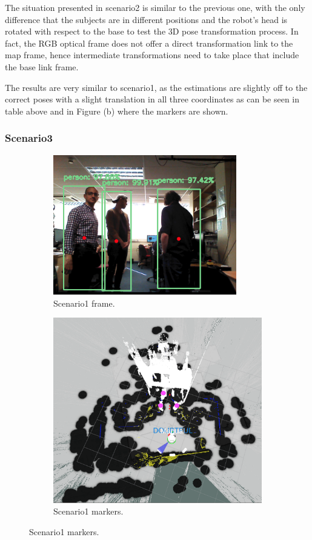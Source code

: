 The situation presented in scenario2 is similar to the previous one, with the only difference that the subjects are in different positions and the robot's head is rotated with respect to the base to test the 3D pose transformation process. In fact, the RGB optical frame does not offer a direct transformation link to the map frame, hence intermediate transformations need to take place that include the base link frame.

The results are very similar to scenario1, as the estimations are slightly off to the correct poses with a slight translation in all three coordinates as can be seen in table above and in Figure (b) where the markers are shown.

\subsubsection{Scenario3}

\begin{figure}[H]
    \begin{subfigure}{.5\textwidth}
        \centering
        \includegraphics[width=8cm]{images/chapter6_scenario3.png}
        \caption{Scenario1 frame.}
        \label{2a}
	\end{subfigure}
    \begin{subfigure}{.5\textwidth}
        \centering
        \includegraphics[width=.9\linewidth]{images/chapter6_extend3.png}
        \caption{Scenario1 markers.}
        \label{2b}
	\end{subfigure}
\end{figure}

